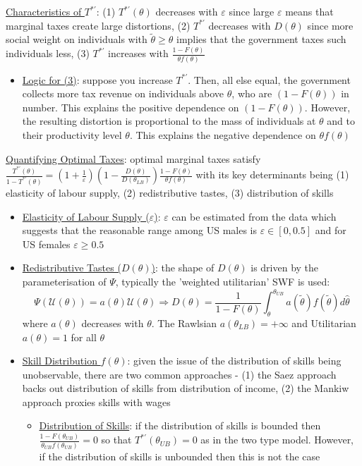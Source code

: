 \documentclass{article}
\begin{document}
\underline{Characteristics of $T^{*'}$}: (1) $T^{*'}(\theta)$ decreases with $\varepsilon$ since large $\varepsilon$ means that marginal taxes create large distortions, (2) $T^{*'}$ decreases with $D(\theta)$ since more social weight on individuals with $\widetilde{\theta} \geq \theta$ implies that the government taxes such individuals less, (3) $T^{*'}$ increases with $\frac{1 - F(\theta)}{\theta f(\theta)}$
\begin{itemize}
    \item  \underline{Logic for (3)}: suppose you increase $T^{*'}$. Then, all else equal, the government collects more tax revenue on individuals above $\theta$, who are $(1 - F(\theta))$ in number. This explains the positive dependence on $(1 - F(\theta))$. However, the resulting distortion is proportional to the mass of individuals at $\theta$ and to their productivity level $\theta$. This explains the negative dependence on $\theta f (\theta)$
\end{itemize}
\vspace{2.5mm}
\par \underline{Quantifying Optimal Taxes}: optimal marginal taxes satisfy $\frac{T^{*'}(\theta)}{1 - T^{*'}(\theta)} = (1 + \frac{1}{\varepsilon}) (1 - \frac{D(\theta)}{D(\theta_{LB})}) \frac{1 - F(\theta)}{\theta f(\theta)}$ with its key determinants being (1) elasticity of labour supply, (2) redistributive tastes, (3) distribution of skills
\begin{itemize}
    \item  \underline{Elasticity of Labour Supply ($\varepsilon$)}: $\varepsilon$ can be estimated from the data which suggests that the reasonable range among US males is $\varepsilon \in [0,0.5]$ and for US females $\varepsilon \geq 0.5$
    \item  \underline{Redistributive Tastes ($D(\theta)$)}: the shape of $D(\theta)$ is driven by the parameterisation of $\Psi$, typically the 'weighted utilitarian' SWF is used: $$\Psi(\mathcal{U}(\theta)) = a(\theta)\mathcal{U}(\theta) \Rightarrow D(\theta) = \frac{1}{1 - F(\theta)} \int_{\theta}^{\theta_{UB}} a(\widetilde{\theta})f(\widetilde{\theta}) d \widehat{\theta}$$ where $a(\theta)$ decreases with $\theta$. The Rawlsian $a(\theta_{LB}) = + \infty$ and Utilitarian $a(\theta) = 1$ for all $\theta$
    \item  \underline{Skill Distribution $f(\theta)$}: given the issue of the distribution of skills being unobservable, there are two common approaches - (1) the Saez approach backs out distribution of skills from distribution of income, (2) the Mankiw approach proxies skills with wages
    \begin{itemize}
        \item  \underline{Distribution of Skills}: if the distribution of skills is bounded then $\frac{1 - F(\theta_{UB})}{\theta_{UB}f (\theta_{UB})} = 0$ so that $T^{*'}(\theta_{UB}) = 0$ as in the two type model. However, if the distribution of skills is unbounded then this is not the case
    \end{itemize}
\end{itemize}
\end{document}
